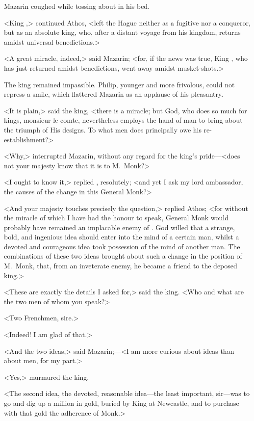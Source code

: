 Mazarin coughed while tossing about in his bed.

<King ,> continued Athos, <left the Hague neither as a fugitive nor a conqueror, but as an absolute king, who, after a distant voyage from his kingdom, returns amidst universal benedictions.>

<A great miracle, indeed,> said Mazarin; <for, if the news was true, King , who has just returned amidst benedictions, went away amidst musket-shots.>

The king remained impassible. Philip, younger and more frivolous, could not repress a smile, which flattered Mazarin as an applause of his pleasantry.

<It is plain,> said the king, <there is a miracle; but God, who does so much for kings, monsieur le comte, nevertheless employs the hand of man to bring about the triumph of His designs. To what men does  principally owe his re-establishment?>

<Why,> interrupted Mazarin, without any regard for the king's pride—<does not your majesty know that it is to M.~Monk?>

<I ought to know it,> replied , resolutely; <and yet I ask my lord ambassador, the causes of the change in this General Monk?>

<And your majesty touches precisely the question,> replied Athos; <for without the miracle of which I have had the honour to speak, General Monk would probably have remained an implacable enemy of . God willed that a strange, bold, and ingenious idea should enter into the mind of a certain man, whilst a devoted and courageous idea took possession of the mind of another man. The combinations of these two ideas brought about such a change in the position of M.~Monk, that, from an inveterate enemy, he became a friend to the deposed king.>

<These are exactly the details I asked for,> said the king. <Who and what are the two men of whom you speak?>

<Two Frenchmen, sire.>

<Indeed! I am glad of that.>

<And the two ideas,> said Mazarin;—<I am more curious about ideas than about men, for my part.>

<Yes,> murmured the king.

<The second idea, the devoted, reasonable idea—the least important, sir—was to go and dig up a million in gold, buried by King  at Newcastle, and to purchase with that gold the adherence of Monk.>

